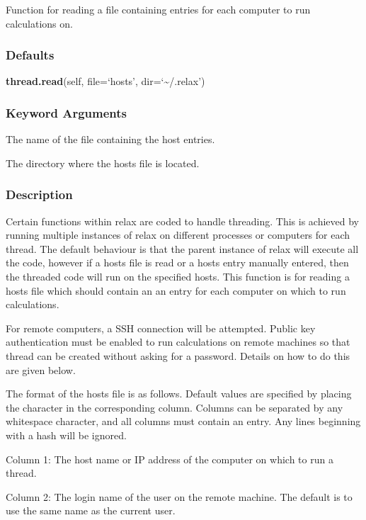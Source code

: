  Function for reading a file containing entries for each computer to run calculations on. 
  

  
 \subsubsection{Defaults} 

 \textsf{\textbf{thread.read}(self, file=`hosts', dir=`\~{}/.relax')} 

  
 \subsubsection{Keyword Arguments} 

   The name of the file containing the host entries.   

   The directory where the hosts file is located.  

  

  
 \subsubsection{Description} 

 Certain functions within relax are coded to handle threading.  This is achieved by running multiple instances of relax on different processes or computers for each thread.  The default behaviour is that the parent instance of relax will execute all the code, however if a hosts file is read or a hosts entry manually entered, then the threaded code will run on the specified hosts.  This function is for reading a hosts file which should contain an an entry for each computer on which to run calculations. 
  

 For remote computers, a SSH connection will be attempted.  Public key authentication must be enabled to run calculations on remote machines so that thread can be created without asking for a password.  Details on how to do this are given below. 
  

 The format of the hosts file is as follows.  Default values are specified by placing the character \quotecmd{-} in the corresponding column.  Columns can be separated by any whitespace character, and all columns must contain an entry.  Any lines beginning with a hash will be ignored. 
  

 Column 1:  The host name or IP address of the computer on which to run a thread. 
  

 Column 2:  The login name of the user on the remote machine.  The default is to use the same name as the current user. 
  

